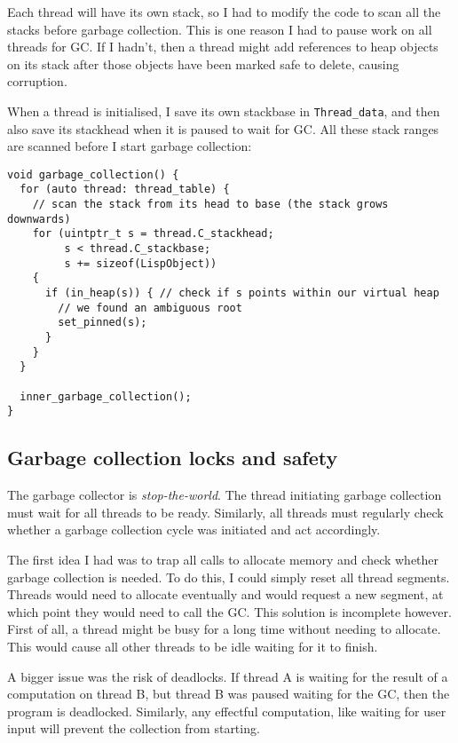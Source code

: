 Each thread will have its own stack, so I had to modify the code to scan all the stacks before garbage
collection. This is one reason I had to pause work on all threads for GC. If I hadn't, then a thread might
add references to heap objects on its stack after those objects have been marked safe to delete, causing corruption.

When a thread is initialised, I save its own stackbase in \texttt{Thread\_data}, and then also save its stackhead
when it is paused to wait for GC. All these stack ranges are scanned before I start garbage collection:

\begin{verbatim}
void garbage_collection() {
  for (auto thread: thread_table) {
    // scan the stack from its head to base (the stack grows downwards)
    for (uintptr_t s = thread.C_stackhead;
         s < thread.C_stackbase;
         s += sizeof(LispObject))
    {
      if (in_heap(s)) { // check if s points within our virtual heap
        // we found an ambiguous root
        set_pinned(s);
      }
    }
  }

  inner_garbage_collection();
}
\end{verbatim}

\subsection{Garbage collection locks and safety}
\label{sec:gclock}
The garbage collector is \emph{stop-the-world}. The thread initiating garbage collection must wait for all
threads to be ready. Similarly, all threads must regularly check whether a garbage collection cycle was
initiated and act accordingly.

The first idea I had was to trap all calls to allocate memory and check whether garbage collection is needed.
To do this, I could simply reset all thread segments. Threads would need to allocate eventually and
would request a new segment, at which point they would need to call the GC. This solution is incomplete however.
First of all, a thread might be busy for a long time without needing to allocate. This would cause all other
threads to be idle waiting for it to finish.

A bigger issue was the risk of deadlocks. If thread A is waiting for the result of a computation on thread B,
but thread B was paused waiting for the GC, then the program is deadlocked. Similarly, any effectful computation,
like waiting for user input will prevent the collection from starting.

